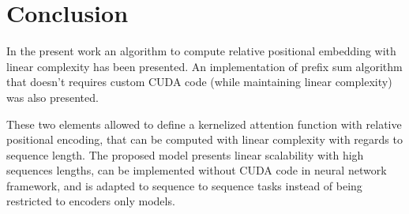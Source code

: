 \section{Conclusion}

In the present work an algorithm to compute
\citet{shaw2018selfattention} relative
positional embedding with linear complexity has been presented. An
implementation of \citet{choromanski2021rethinking} prefix sum algorithm that doesn't requires custom CUDA
code (while maintaining linear complexity) was also presented.

These two elements allowed to define a kernelized attention function
with relative positional encoding, that can be computed with linear
complexity with regards to sequence length. The proposed model presents
linear scalability with high sequences lengths, can be implemented without CUDA code in neural network framework, and is adapted to sequence to sequence tasks instead of being restricted to encoders only models.

\endinput
